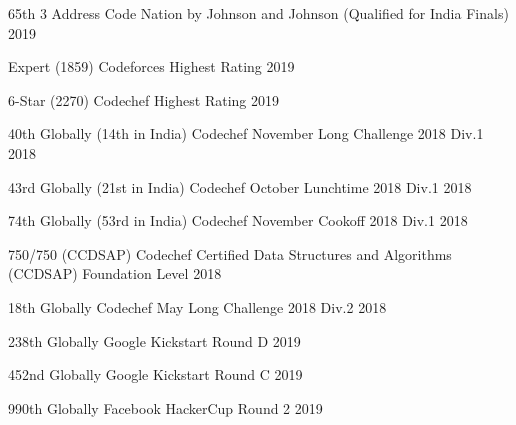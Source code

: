 \begin{cvhonors}
\cvhonor
{65th} %
{3 Address Code Nation by Johnson and Johnson (Qualified for India Finals)} %
{} %
{2019} %


\cvhonor
{Expert (1859)} %
{Codeforces Highest Rating} %
{} %
{2019} %


\cvhonor
{6-Star (2270)} %
{Codechef Highest Rating} %
{} %
{2019} %


\cvhonor
{40th Globally (14th in India)} %
{Codechef November Long Challenge 2018 Div.1} %
{} %
{2018} %


\cvhonor
{43rd Globally (21st in India)} %
{Codechef October Lunchtime 2018 Div.1} %
{} %
{2018} %


\cvhonor
{74th Globally (53rd in India)} %
{Codechef November Cookoff 2018 Div.1} %
{} %
{2018} %


\cvhonor
{750/750 (CCDSAP)} %
{Codechef Certified Data Structures and Algorithms (CCDSAP) Foundation Level} %
{} %
{2018} %


\cvhonor
{18th Globally} %
{Codechef May Long Challenge 2018 Div.2} %
{} %
{2018} %


\cvhonor
{238th Globally} %
{Google Kickstart Round D} %
{} %
{2019} %


\cvhonor
{452nd Globally} %
{Google Kickstart Round C} %
{} %
{2019} %


\cvhonor
{990th Globally} %
{Facebook HackerCup Round 2} %
{} %
{2019} %


\end{cvhonors}
